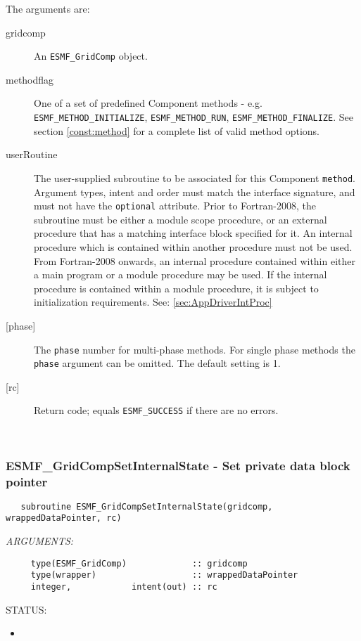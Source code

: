    The arguments are:
   \begin{description}
   \item[gridcomp]
     An {\tt ESMF\_GridComp} object.
   \item[methodflag]
     \begin{sloppypar}
     One of a set of predefined Component methods - e.g.
     {\tt ESMF\_METHOD\_INITIALIZE}, {\tt ESMF\_METHOD\_RUN},
     {\tt ESMF\_METHOD\_FINALIZE}. See section \ref{const:method}
     for a complete list of valid method options.
     \end{sloppypar}
   \item[userRoutine]
     The user-supplied subroutine to be associated for this Component
     {\tt method}.  Argument types, intent and order must match
     the interface signature, and must not have the {\tt optional} attribute.
     Prior to Fortran-2008, the subroutine must be either a module scope procedure,
     or an external procedure that has a matching interface block specified for it.
     An internal procedure which is contained within another procedure must not be used.
     From Fortran-2008 onwards, an internal procedure contained within either a main program
     or a module procedure may be used.  If the internal procedure is contained within a
     module procedure, it is subject to initialization requirements.  See: \ref{sec:AppDriverIntProc}
   \item[{[phase]}]
     The {\tt phase} number for multi-phase methods. For single phase
     methods the {\tt phase} argument can be omitted. The default setting
     is 1.
   \item[{[rc]}]
     Return code; equals {\tt ESMF\_SUCCESS} if there are no errors.
   \end{description}
   
 
\mbox{}\hrulefill\ 
 
\subsubsection [ESMF\_GridCompSetInternalState] {ESMF\_GridCompSetInternalState - Set private data block pointer}


  
\begin{verbatim}   subroutine ESMF_GridCompSetInternalState(gridcomp, wrappedDataPointer, rc)\end{verbatim}{\em ARGUMENTS:}
\begin{verbatim}     type(ESMF_GridComp)             :: gridcomp
     type(wrapper)                   :: wrappedDataPointer
     integer,            intent(out) :: rc\end{verbatim}
{\sf STATUS:}
   \begin{itemize}
   \item{}
   \end{itemize}
  
